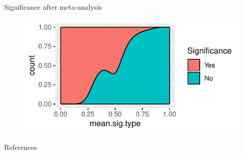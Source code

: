 \documentclass[english]{beamer}\usepackage[]{graphicx}\usepackage[]{color}
\makeatletter
\def\maxwidth{ %
  \ifdim\Gin@nat@width>\linewidth
    \linewidth
  \else
    \Gin@nat@width
  \fi
}
\newenvironment{knitrout}{}{} %
\makeatother
\begin{document}
\begin{frame}{Significance after meta-analysis}

\begin{figure}[fragile]
\begin{knitrout}
\color{fgcolor}
\includegraphics[width=\maxwidth]{figure/unnamed-chunk-13-1} 

\end{knitrout}
\end{figure}
\end{frame}


\begin{frame}{References}
  \small
  

\end{frame}


\end{document}
